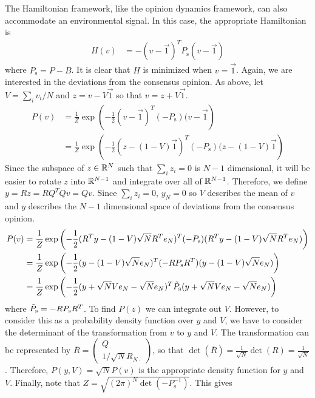 \documentclass{article}
\begin{document}
The Hamiltonian framework, like the opinion dynamics framework, can also accommodate an environmental signal. In this case, the appropriate Hamiltonian is 
\begin{equation}
\begin{array}{lll}
H(v)&=-(v-\vec{1})^TP_\text{s}(v-\vec{1})
\end{array}
\end{equation}
where $P_\text{s}=P-B$.
It is clear that $H$ is minimized when $v=\vec{1}$. 
Again, we are interested in the deviations from the consensus opinion. As above, let $V=\sum_iv_i/N$ and $z=v-V\vec{1}$ so that $v=z+V\vec{1}$. 
\begin{align*}
P(v)&=\frac{1}{Z}\exp\left(-\frac{1}{2}(v-\vec{1})^T(-P_\text{s})(v-\vec{1}\right)
\\&=\frac{1}{Z}\exp\left(-\frac{1}{2}(z-(1-V)\vec{1})^T(-P_\text{s})(z-(1-V)\vec{1}\right)
\end{align*}
Since the subspace of $z\in{\mathbb{R}}^N$ such that $\sum_iz_i=0$ is $N-1$ dimensional, it will be easier to rotate $z$ into ${\mathbb{R}}^{N-1}$ and integrate over all of ${\mathbb{R}}^{N-1}$.  Therefore, we define $y=Rz=RQ^TQv=Qv$. Since $\sum_iz_i=0$, $y_N=0$ so $V$ describes the mean of $v$ and $y$ describes the $N-1$ dimensional space of deviations from the consensus opinion. 
\begin{align*}
P(v)&=\frac{1}{Z}\exp\left(-\frac{1}{2}(R^Ty-(1-V)\sqrt{N}R^Te_N)^T(-P_\text{s})(R^Ty-(1-V)\sqrt{N}R^Te_N)\right)
\\&=\frac{1}{Z}\exp\left(-\frac{1}{2}(y-(1-V)\sqrt{N}e_N)^T(-RP_\text{s}R^T)(y-(1-V)\sqrt{N}e_N)\right)
\\&=\frac{1}{Z}\exp\left(-\frac{1}{2}(y+\sqrt{N}Ve_N-\sqrt{N}e_N)^T\Tilde{P}_\text{s}(y+\sqrt{N}Ve_N-\sqrt{N}e_N)\right)
\end{align*}
where $\Tilde{P}_\text{s}=-RP_\text{s}R^T$. To find $P(z)$ we can integrate out $V$. However, to consider this as a probability density function over $y$ and $V$, we have to consider the determinant of the transformation from $v$ to $y$ and $V$.  The  transformation can be represented by $\bar{R}=\left(\begin{array}{cc}Q \\1/\sqrt{N}R_{N\cdot }\end{array}\right)$, so that $\det(\bar{R})=\frac{1}{\sqrt{N}}\det(R)=\frac{1}{\sqrt{N}}$. Therefore, $P(y,V)=\sqrt{N}P(v)$ is the appropriate density function for $y$ and $V$. Finally, note that $Z=\sqrt{(2\pi)^N\det(-P_\text{s}^{-1})}$. This gives
\end{document}
